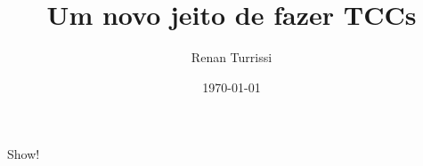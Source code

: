 \documentclass{article}
\author{Renan Turrissi}
\date{\today}
\title{Um novo jeito de fazer TCCs}
\begin{document}
\maketitle

Show!
\end{document}
